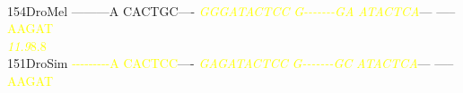 \documentclass[11pt,twoside,reqno,a4paper]{article}
\begin{document}
{\\
154\hspace*{1\charwidth}DroMel	---------A	CACTGC----	\textit{\textcolor{Yellow}{G}}\textit{\textcolor{Yellow}{G}}\textit{\textcolor{Yellow}{G}}\textit{\textcolor{Yellow}{A}}\textit{\textcolor{Yellow}{T}}\textit{\textcolor{Yellow}{A}}\textit{\textcolor{Yellow}{C}}\textit{\textcolor{Yellow}{T}}\textit{\textcolor{Yellow}{C}}\textit{\textcolor{Yellow}{C}}	\textit{\textcolor{Yellow}{G}}\textit{\textcolor{Yellow}{-}}\textit{\textcolor{Yellow}{-}}\textit{\textcolor{Yellow}{-}}\textit{\textcolor{Yellow}{-}}\textit{\textcolor{Yellow}{-}}\textit{\textcolor{Yellow}{-}}\textit{\textcolor{Yellow}{-}}\textit{\textcolor{Yellow}{G}}\textit{\textcolor{Yellow}{A}}	\textit{\textcolor{Yellow}{A}}\textit{\textcolor{Yellow}{T}}\textit{\textcolor{Yellow}{A}}\textit{\textcolor{Yellow}{C}}\textit{\textcolor{Yellow}{T}}\textit{\textcolor{Yellow}{C}}\textit{\textcolor{Yellow}{A}}---	-----\textcolor{Yellow}{A}\textcolor{Yellow}{A}\textcolor{Yellow}{G}\textcolor{Yellow}{A}\textcolor{Yellow}{T}	\\
\hspace*{4\charwidth}\hspace*{7\charwidth}\hspace*{1\charwidth}\hspace*{1\charwidth}\hspace*{20\charwidth}\textit{\textcolor{Yellow}{11.9}}\hspace*{1\charwidth}\hspace*{1\charwidth}\hspace*{1\charwidth}\hspace*{31\charwidth}\textcolor{Yellow}{8.8}\hspace*{1\charwidth}\\
151\hspace*{1\charwidth}DroSim	\textcolor{Yellow}{-}\textcolor{Yellow}{-}\textcolor{Yellow}{-}\textcolor{Yellow}{-}\textcolor{Yellow}{-}\textcolor{Yellow}{-}\textcolor{Yellow}{-}\textcolor{Yellow}{-}\textcolor{Yellow}{-}\textcolor{Yellow}{A}	\textcolor{Yellow}{C}\textcolor{Yellow}{A}\textcolor{Yellow}{C}\textcolor{Yellow}{T}\textcolor{Yellow}{C}\textcolor{Yellow}{C}----	\textit{\textcolor{Yellow}{G}}\textit{\textcolor{Yellow}{A}}\textit{\textcolor{Yellow}{G}}\textit{\textcolor{Yellow}{A}}\textit{\textcolor{Yellow}{T}}\textit{\textcolor{Yellow}{A}}\textit{\textcolor{Yellow}{C}}\textit{\textcolor{Yellow}{T}}\textit{\textcolor{Yellow}{C}}\textit{\textcolor{Yellow}{C}}	\textit{\textcolor{Yellow}{G}}\textit{\textcolor{Yellow}{-}}\textit{\textcolor{Yellow}{-}}\textit{\textcolor{Yellow}{-}}\textit{\textcolor{Yellow}{-}}\textit{\textcolor{Yellow}{-}}\textit{\textcolor{Yellow}{-}}\textit{\textcolor{Yellow}{-}}\textit{\textcolor{Yellow}{G}}\textit{\textcolor{Yellow}{C}}	\textit{\textcolor{Yellow}{A}}\textit{\textcolor{Yellow}{T}}\textit{\textcolor{Yellow}{A}}\textit{\textcolor{Yellow}{C}}\textit{\textcolor{Yellow}{T}}\textit{\textcolor{Yellow}{C}}\textit{\textcolor{Yellow}{A}}---	-----\textcolor{Yellow}{A}\textcolor{Yellow}{A}\textcolor{Yellow}{G}\textcolor{Yellow}{A}\textcolor{Yellow}{T}	\\
}
\end{document}
